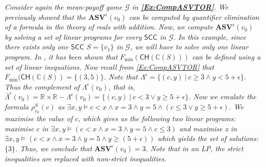 \begin{example}
\label{Ex:CompASVLP}
\emph{Consider again
the mean-payoff game $\mathcal{G}$ in \textbf{\cref{Ex:CompASVTOR}}.}
\emph{We previously showed that the $\mathbf{ASV}^{\epsilon}(v_0)$ can be computed by quantifier elimination of a formula in the theory of reals with addition. Now, we compute $\mathbf{ASV}^{\epsilon}(v_0)$ by solving a set of linear programs for every $\mathsf{SCC}$ in $\mathcal{G}$.}
\emph{In this example, since there exists only one $\mathsf{SCC}$ $S = \{v_1\}$ in $\mathcal{G}$, we will have to solve only one linear program. 
In \cite{CDEHR10}, it has been shown that $F_{\min}(\mathsf{CH}(\mathbb{C}(S)))$ can be defined using a set of linear inequations.
Now recall from \cref{Ex:CompASVTOR} that $F_{\min}(\mathsf{CH}(\mathbb{C}(S))=\{(3,5)\}$.
Note that $\Lambda^{\epsilon} = \{(c,y) \:|\: c \geqslant 3 \land y < 5 + \epsilon \}$.
Thus the complement of $\Lambda^{\epsilon}(v_0)$, that is, $\bar{\Lambda}^{\epsilon}(v_0) = \mathbb{R} \times \mathbb{R} - \Lambda^{\epsilon}(v_0) = \{(c,y) \:|\: c < 3 \lor y \geqslant 5 + \epsilon \}$.
Now we emulate the formula $\rho_{v_0}^S(c)$ as $\exists x,y \models c<x \land x=3 \land y=5 \land (c \leqslant 3 \lor y \geqslant 5+\epsilon)$.
We maximise the value of $c$, which gives us the following two linear programs: \textit{maximise $c$ in $\exists x, y \models (c < x \land x = 3 \land y = 5 \land c \leqslant 3)$} and \textit{maximise x in $\exists x, y \models (c < x \land x = 3 \land y = 5 \land y \geqslant (5 + \epsilon))$} which yields the set of solutions: $\{3\}$. Thus, we conclude that $\mathbf{ASV}^{\epsilon}(v_0) = 3$.
Note that in an LP, the strict inequalities are replaced with non-strict inequalities.}
\end{example}

